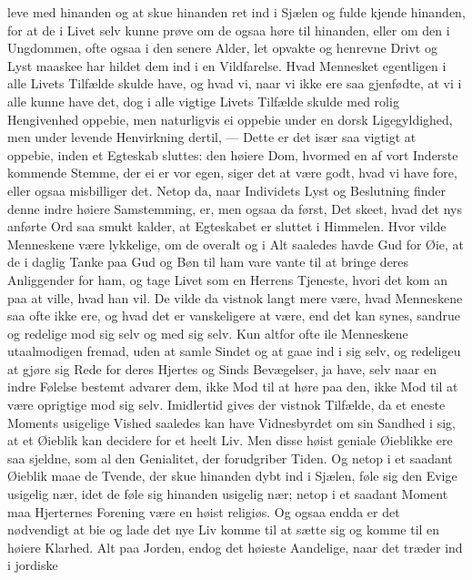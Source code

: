 \documentclass[12pt,a4paper]{book}
\newcommand{\apage}[1]{\marginnote{\footnotesize\textit{[#1]}}}
\begin{document}
leve med hinanden og at skue hinanden ret ind i Sjælen og \apage{80} fulde kjende
hinanden, for at de i Livet selv kunne prøve om de ogsaa høre til
hinanden, eller om den i Ungdommen, ofte ogsaa i den senere Alder, let
opvakte og henrevne Drivt og Lyst maaskee har hildet dem ind i en
Vildfarelse.
Hvad Mennesket egentligen i alle Livets Tilfælde skulde have, og hvad
vi, naar vi ikke ere saa gjenfødte, at vi i alle kunne have det, dog i
alle vigtige Livets Tilfælde skulde med rolig Hengivenhed oppebie, men
naturligvis ei oppebie under en dorsk Ligegyldighed, men under levende
Henvirkning dertil, --- Dette er det især saa vigtigt at oppebie, inden
et Egteskab sluttes: den høiere Dom, hvormed en af vort Inderste
kommende Stemme, der ei er vor egen, siger det at være godt, hvad vi
have fore, eller ogsaa misbilliger det. Netop da, naar Individets Lyst
og Beslutning finder denne indre høiere Samstemming, er, men ogsaa da
først, Det skeet, hvad det nys anførte Ord saa smukt kalder, at
Egteskabet er sluttet i Himmelen. Hvor vilde Menneskene være lykkelige,
om de overalt og i Alt saaledes havde Gud for Øie, at de i daglig Tanke
paa Gud og Bøn til ham vare vante til at bringe deres Anliggender for
ham, og tage Livet som en Herrens Tjeneste, hvori det kom an paa at
ville, hvad han vil. De vilde da vistnok langt mere være, hvad
Menneskene saa ofte ikke ere, og hvad det er vanskeligere at være, end
det kan synes, sandrue og redelige mod sig selv og med sig selv. Kun
altfor ofte ile Menneskene utaalmodigen fremad, uden at samle Sindet \apage{81} og
at gaae ind i sig selv, og redeligeu at gjøre sig Rede for deres Hjertes
og Sinds Bevægelser, ja have, selv naar en indre Følelse bestemt advarer
dem, ikke Mod til at høre paa den, ikke Mod til at være oprigtige mod
sig selv. Imidlertid gives der vistnok Tilfælde, da et eneste Moments
usigelige Vished saaledes kan have Vidnesbyrdet om sin Sandhed i sig, at
et Øieblik kan decidere for et heelt Liv. Men disse høist geniale
Øieblikke ere saa sjeldne, som al den Genialitet, der forudgriber Tiden.
Og netop i et saadant Øieblik maae de Tvende, der skue hinanden dybt ind
i Sjælen, føle sig den Evige usigelig nær, idet de føle sig hinanden
usigelig nær; netop i et saadant Moment maa Hjerternes Forening være en
høist religiøs. Og ogsaa endda er det nødvendigt at bie og lade det nye
Liv komme til at sætte sig og komme til en høiere Klarhed. Alt paa
Jorden, endog det høieste Aandelige, naar det træder ind i jordiske
\end{document}
